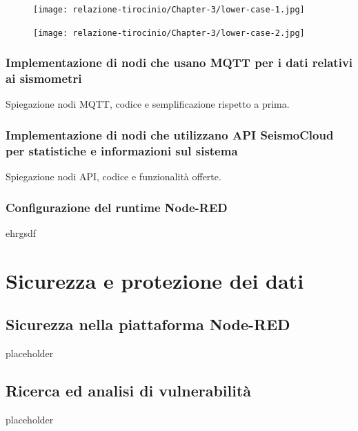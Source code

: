 \documentclass[a4paper,10pt]{memoir}
\begin{document}
\begin{figure}[ht]
    \texttt{[image: relazione-tirocinio/Chapter-3/lower-case-1.jpg]}
    \label{fig:lower-case-1}
\end{figure}

\begin{figure}[ht]
    \texttt{[image: relazione-tirocinio/Chapter-3/lower-case-2.jpg]}
    \label{fig:lower-case-2}
\end{figure}

\subsection{Implementazione di nodi che usano MQTT per i dati relativi ai sismometri}

Spiegazione nodi MQTT, codice e semplificazione rispetto a prima.

\subsection{Implementazione di nodi che utilizzano API SeismoCloud per statistiche e informazioni sul sistema}

Spiegazione nodi API, codice e funzionalità offerte.

\subsection{Configurazione del runtime Node-RED}

ehrgsdf

\clearpage


\chapter{Sicurezza e protezione dei dati}

\section{Sicurezza nella piattaforma Node-RED}

placeholder

\clearpage

\section{Ricerca ed analisi di vulnerabilità}

placeholder
\end{document}
